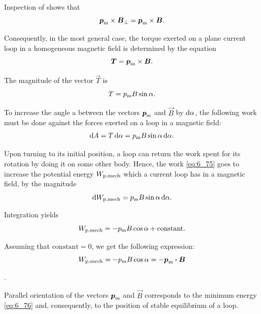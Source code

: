 \noindent
Inspection of  shows that
\begin{equation*}
    \boldsymbol{p}_{\text{m}} \times \boldsymbol{B}_{\perp} = \boldsymbol{p}_{\text{m}} \times \boldsymbol{B}.
\end{equation*}

\noindent
Consequently, in the most general case, the torque exerted on a plane current loop in a homogeneous magnetic field is determined by the equation
\begin{equation}\label{eq:6_73}
    \boldsymbol{T} = \boldsymbol{p}_{\text{m}} \times \boldsymbol{B}.
\end{equation}

\noindent
The magnitude of the vector $\vec{T}$ is
\begin{equation}\label{eq:6_74}
    T = p_{\text{m}} B \sin\alpha.
\end{equation}

To increase the angle a between the vectors $\boldsymbol{p}_{\text{m}}$ and $\vec{B}$ by $\mathrm{d}\alpha$, the following work must be done against the forces exerted on a loop in a magnetic field:
\begin{equation}\label{eq:6_75}
    \mathrm{d} A = T\, \mathrm{d}\alpha = p_{\text{m}} B \sin\alpha\, \mathrm{d}\alpha.
\end{equation}

\noindent
Upon turning to its initial position, a loop can return the work spent for its rotation by doing it on some other body. Hence, the work \eqref{eq:6_75} goes to increase the potential energy $W_{\text{p,mech}}$ which a current loop has in a magnetic field, by the magnitude
\begin{equation*}
    \mathrm{d}W_{\text{p,mech}} = p_{\text{m}} B \sin\alpha\, \mathrm{d}\alpha.
\end{equation*}

\noindent
Integration yields
\begin{equation*}
    W_{\text{p,mech}} = - p_{\text{m}} B \cos\alpha + \text{constant}.
\end{equation*}

\noindent
Assuming that $\text{constant}=0$, we get the following expression:
\begin{equation}\label{eq:6_76}
    W_{\text{p,mech}} = - p_{\text{m}} B \cos\alpha = - \boldsymbol{p}_{\text{m}} \boldsymbol{\cdot} \boldsymbol{B}
\end{equation}

.

Parallel orientation of the vectors $\boldsymbol{p}_{\text{m}}$ and $\vec{B}$ corresponds to the minimum energy \eqref{eq:6_76} and, consequently, to the position of stable equilibrium of a loop.

